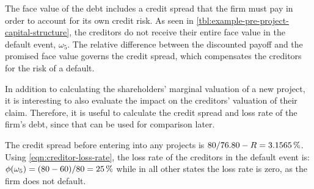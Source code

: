 \documentclass[main.tex]{subfiles}
\begin{document}
    The face value of the debt includes a credit spread that the firm must pay in order to account for its own credit risk.
    As seen in \cref{tbl:example-pre-project-capital-structure},
    the creditors do not receive their entire face value in the default event, $\omega_5$.
    The relative difference between the discounted payoff and the promised face value
    governs the credit spread, which compensates the creditors for the risk of a default.

    In addition to calculating the shareholders' marginal valuation of a new project,
    it is interesting to also evaluate the impact on the creditors' valuation of their claim. 
    Therefore, it is useful to calculate the credit spread and loss rate of the firm's debt,
    since that can be used for comparison later.

    The credit spread before entering into any projects is 
    $\num{80}/\num{76.80} - \grossrfrate = \pct{0.031565}$.
    Using \cref{eqn:creditor-loss-rate}, the loss rate of the creditors in the default event is:
    $\phi(\omega_{5}) = (\num{80}-\num{60})/\num{80} = \pct{0.25}$
    while in all other states the loss rate is zero, as the firm does not default.
\end{document}
